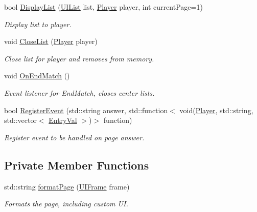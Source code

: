 \begin{DoxyCompactItemize}
bool \hyperlink{classUIManager_aa8187f1c1988d5934adc5c793be85778}{Display\-List} (\hyperlink{structUIList}{U\-I\-List} list, \hyperlink{structPlayer}{Player} player, int current\-Page=1)
\begin{DoxyCompactList}\small\item\em Display list to player. \end{DoxyCompactList}\item 
void \hyperlink{classUIManager_af8510d387057f6778b88d5bcd8bd97a6}{Close\-List} (\hyperlink{structPlayer}{Player} player)
\begin{DoxyCompactList}\small\item\em Close list for player and removes from memory. \end{DoxyCompactList}\item 
\hypertarget{classUIManager_af71f25628d303286cd7f54375314e09b}{void \hyperlink{classUIManager_af71f25628d303286cd7f54375314e09b}{On\-End\-Match} ()}\label{classUIManager_af71f25628d303286cd7f54375314e09b}

\begin{DoxyCompactList}\small\item\em Event listener for End\-Match, closes center lists. \end{DoxyCompactList}\item 
bool \hyperlink{classUIManager_a8192019b49fa0f4b28174ac7f93910fb}{Register\-Event} (std\-::string answer, std\-::function$<$ void(\hyperlink{structPlayer}{Player}, std\-::string, std\-::vector$<$ \hyperlink{structEntryVal}{Entry\-Val} $>$)$>$ function)
\begin{DoxyCompactList}\small\item\em Register event to be handled on page answer. \end{DoxyCompactList}\end{DoxyCompactItemize}
\subsection*{Private Member Functions}
\begin{DoxyCompactItemize}
\item 
std\-::string \hyperlink{classUIManager_a2bfbf770019b05d660ba8f177993c16a}{format\-Page} (\hyperlink{structUIFrame}{U\-I\-Frame} frame)
\begin{DoxyCompactList}\small\item\em Formats the page, including custom U\-I. \end{DoxyCompactList}\end{DoxyCompactItemize}
